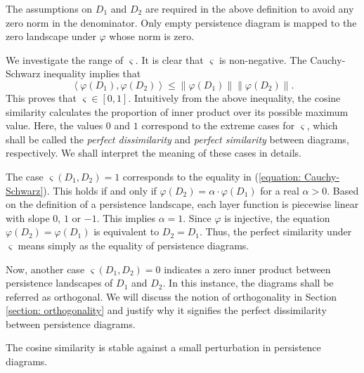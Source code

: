 \documentclass[sn-mathphys-num]{sn-jnl}%
\theoremstyle{thmstyleone}%
\theoremstyle{thmstyletwo}%
\theoremstyle{thmstylethree}%
\begin{document}
The assumptions on $D_1$ and $D_2$ are required in the above definition to avoid any zero norm in the denominator. Only empty persistence diagram is mapped to the zero landscape under $\varphi$ whose norm is zero.

We investigate the range of $\varsigma$. It is clear that $\varsigma$ is non-negative. The Cauchy-Schwarz inequality \cite{Beckenbach-Bellman} implies that
\begin{equation}\label{equation: Cauchy-Schwarz}
	\left\langle\varphi(D_1), \varphi(D_2)\right\rangle \leq\left\|\varphi(D_1)\right\|\left\|\varphi(D_2)\right\|.
\end{equation}
This proves that $\varsigma \in[0,1]$. Intuitively from the above inequality, the cosine similarity calculates the proportion of inner product over its possible maximum value. Here, the values $0$ and $1$ correspond to the extreme cases for $\varsigma$, which shall be called the \emph{perfect dissimilarity} and \emph{perfect similarity} between diagrams, respectively. We shall interpret the meaning of these cases in details.

The case $\varsigma(D_1, D_2)=1$ corresponds to the equality in (\ref{equation: Cauchy-Schwarz}). This holds if and only if $\varphi(D_2)=\alpha \cdot \varphi(D_1)$ for a real $\alpha>0$. Based on the definition of a persistence landscape, each layer function is piecewise linear with slope $0$, $1$ or $-1$. This implies $\alpha=1$. Since $\varphi$ is injective, the equation $\varphi(D_2)=\varphi(D_1)$ is equivalent to $D_2=D_1$. Thus, the perfect similarity under $\varsigma$ means simply as the equality of persistence diagrams.

Now, another case $\varsigma(D_1, D_2)=0$ indicates a zero inner product between persistence landscapes of $D_1$ and $D_2$. In this instance, the diagrams shall be referred as orthogonal. We will discuss the notion of orthogonality in Section \ref{section: orthogonality} and justify why it signifies the perfect dissimilarity between persistence diagrams.

The cosine similarity is stable against a small perturbation in persistence diagrams.
\end{document}

